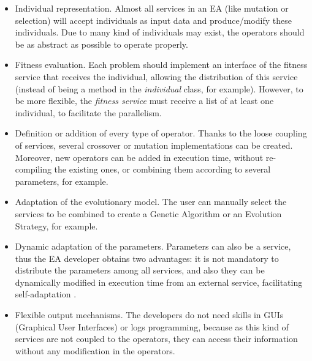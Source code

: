 \begin{itemize}
\item Individual representation. Almost all services in an EA (like mutation or selection) will accept individuals as input data and produce/modify these individuals. Due to many kind of individuals may exist, the operators should be as abstract as possible to operate properly.
\item Fitness evaluation. Each problem should implement an interface of the fitness service that receives the individual, allowing the distribution of this service (instead of being a method in the {\em individual} class, for example). However, to be more flexible, the {\em fitness service} must receive a list of at least one individual, to facilitate the parallelism.
\item Definition or addition of every type of operator. Thanks to the loose coupling of services, several crossover or mutation implementations can be created. Moreover, new operators can be added in execution time, without re-compiling the existing ones, or combining them according to several parameters, for example.
\item Adaptation of the evolutionary model. The user can manually select the services to be combined to create a Genetic Algorithm or an Evolution Strategy, for example.
\item Dynamic adaptation of the parameters. Parameters can also be a service, thus the EA developer obtains two advantages: it is not mandatory to distribute the parameters among all services, and also they can be dynamically modified in execution time from an external service, facilitating self-adaptation \citep{SELFSTAR}.
\item Flexible output mechanisms. The developers do not need skills in GUIs (Graphical User Interfaces) or logs programming, because as this kind of services are not coupled to the operators, they can access their information without any modification in the operators.
\end{itemize}






